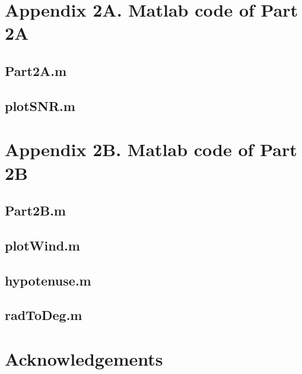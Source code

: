 \documentclass{article}
\begin{document}



\section{Appendix 2A. Matlab code of Part 2A}

\subsection{Part2A.m}


\subsection{plotSNR.m}



\section{Appendix 2B. Matlab code of Part 2B}

\subsection{Part2B.m}


\subsection{plotWind.m}


\subsection{hypotenuse.m}


\subsection{radToDeg.m}



\section{Acknowledgements}
\end{document}
